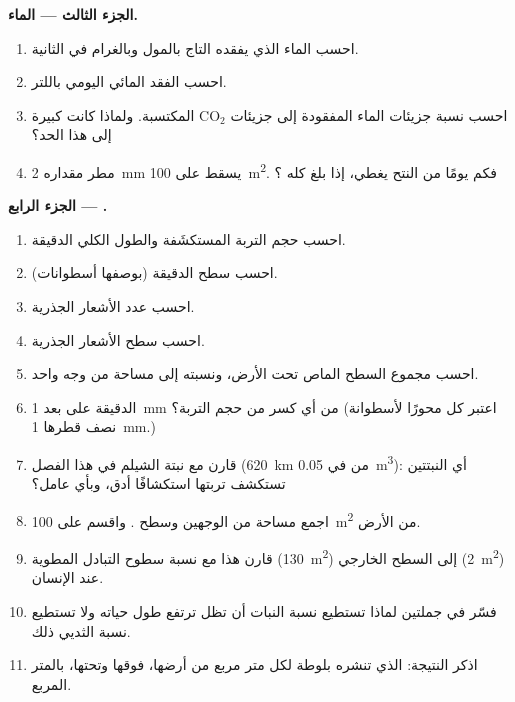 \begin{problem}
\medskip
\noindent\textbf{الجزء الثالث --- الماء.}
\begin{enumerate}[resume]
  \item احسب الماء الذي يفقده التاج بالمول وبالغرام في الثانية.
  \item احسب الفقد المائي اليومي باللتر.
  \item احسب نسبة جزيئات الماء المفقودة إلى جزيئات $\mathrm{CO_2}$
        المكتسبة. ولماذا كانت كبيرة إلى هذا الحد؟
  \item مطر مقداره \qty{2}{mm} يسقط على \qty{100}{m^2}. فكم يومًا من
        النتح يغطي، إذا بلغ كله ؟
\end{enumerate}

\medskip
\noindent\textbf{الجزء الرابع --- .}
\begin{enumerate}[resume]
  \item احسب حجم التربة المستكشَفة والطول الكلي  الدقيقة.
  \item احسب سطح  الدقيقة (بوصفها أسطوانات).
  \item احسب عدد الأشعار الجذرية.
  \item احسب سطح الأشعار الجذرية.
  \item احسب مجموع السطح الماص تحت الأرض، ونسبته إلى مساحة 
        من وجه واحد.
  \item {} الدقيقة على بعد \qty{1}{mm} من أي كسر من حجم التربة؟
        (اعتبر كل  محورًا لأسطوانة نصف قطرها \qty{1}{mm}.)
  \item قارن مع نبتة الشيلم في هذا الفصل (\qty{620}{km} من 
        في \qty{0.05}{m^3}): أي النبتتين تستكشف تربتها استكشافًا
        أدق، وبأي عامل؟
  \item اجمع مساحة  من الوجهين وسطح . واقسم على
        \qty{100}{m^2} من الأرض.
  \item قارن هذا مع نسبة سطوح التبادل المطوية (\qty{130}{m^2}) إلى
        السطح الخارجي (\qty{2}{m^2}) عند الإنسان.
  \item فسّر في جملتين لماذا تستطيع نسبة النبات أن تظل ترتفع طول
        حياته ولا تستطيع نسبة الثديي ذلك.
  \item اذكر النتيجة:  الذي تنشره بلوطة لكل متر مربع من
        أرضها، فوقها وتحتها، بالمتر المربع.
\end{enumerate}
\end{problem}
